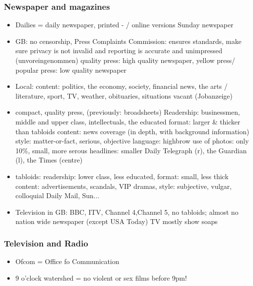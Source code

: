 \documentclass[a5paper,12pt,twoside,titlepage]{scrartcl}
\begin{document}
\subsubsection{Newspaper and magazines}
	\begin{itemize}
	\item  
	\subitem Dailies = daily newspaper, printed - / online versions
	\subitem Sunday newspaper
	\item GB: 
	\subitem no censorship, 
	\subitem Press Complaints Commission: ensures standards, make sure privacy is not invalid and reporting is accurate and unimpressed (unvoreingenommen)
	\subitem quality press: high quality newspaper, 
	\subitem yellow press/ popular press: low quality newspaper
	\item Local: 
	\subitem content: politics, the economy, society, financial news, the arts / literature, sport, TV, weather, obituaries, situations vacant (Jobanzeige)
	\item compact, quality press, (previously: broadsheets)
	\subitem Readership: businessmen, middle and upper class, intellectuals, the educated
	\subitem format: larger \& thicker than tabloids 
	\subitem content: news coverage (in depth, with background information)
	\subitem style: matter-or-fact, serious, objective
	\subitem language: highbrow
	\subitem  use of photos: only 10\%, small, more serous
	\subitem headlines: smaller
	\subitem Daily Telegraph (r), the Guardian (l), the Times (centre)
	\item tabloids:
	\subitem readership: lower class, less educated, 
	\subitem format: small, less thick
	\subitem content: advertisements, scandals, VIP dramas, 
	\subitem style: subjective, vulgar, colloquial
	\subitem Daily Mail, Sun...
	\item Television in GB:
	\subitem  BBC, ITV, Channel 4,Channel 5, 
	\subitem no tabloids; almost no nation wide newspaper (except USA Today)	
	\subitem TV mostly show soaps
	\end{itemize}

\subsubsection{Television and Radio}
\begin{itemize}
 \item Ofcom = Office fo Communication
 \item 9 o'clock watershed = no violent or sex films before 9pm!
 
\end{itemize}
\end{document}
